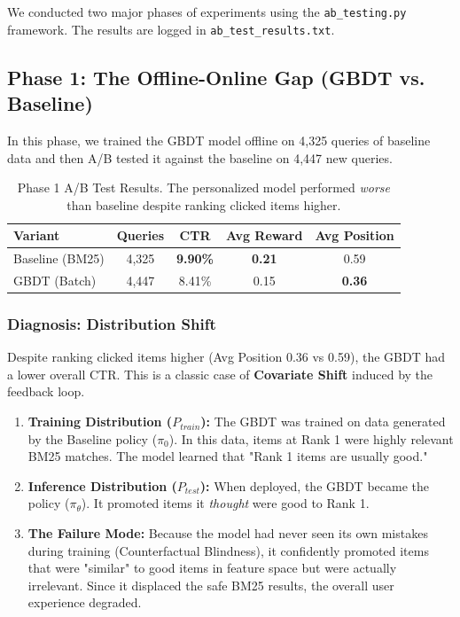 \documentclass[11pt,a4paper]{article}
\begin{document}
We conducted two major phases of experiments using the \texttt{ab\_testing.py} framework. The results are logged in \texttt{ab\_test\_results.txt}.

\subsection{Phase 1: The Offline-Online Gap (GBDT vs. Baseline)}
In this phase, we trained the GBDT model offline on 4,325 queries of baseline data and then A/B tested it against the baseline on 4,447 new queries.

\begin{table}[H]
\centering
\begin{tabular}{@{}lcccc@{}}
\toprule
\textbf{Variant} & \textbf{Queries} & \textbf{CTR} & \textbf{Avg Reward} & \textbf{Avg Position} \\ \midrule
Baseline (BM25) & 4,325 & \textbf{9.90\%} & \textbf{0.21} & 0.59 \\
GBDT (Batch) & 4,447 & 8.41\% & 0.15 & \textbf{0.36} \\ \bottomrule
\end{tabular}
\caption{Phase 1 A/B Test Results. The personalized model performed \textit{worse} than baseline despite ranking clicked items higher.}
\end{table}

\subsubsection{Diagnosis: Distribution Shift}
Despite ranking clicked items higher (Avg Position 0.36 vs 0.59), the GBDT had a lower overall CTR. This is a classic case of \textbf{Covariate Shift} induced by the feedback loop.
\begin{enumerate}
    \item \textbf{Training Distribution ($P_{train}$):} The GBDT was trained on data generated by the Baseline policy ($\pi_0$). In this data, items at Rank 1 were highly relevant BM25 matches. The model learned that "Rank 1 items are usually good."
    \item \textbf{Inference Distribution ($P_{test}$):} When deployed, the GBDT became the policy ($\pi_\theta$). It promoted items it \textit{thought} were good to Rank 1.
    \item \textbf{The Failure Mode:} Because the model had never seen its own mistakes during training (Counterfactual Blindness), it confidently promoted items that were "similar" to good items in feature space but were actually irrelevant. Since it displaced the safe BM25 results, the overall user experience degraded.
\end{enumerate}
\end{document}
